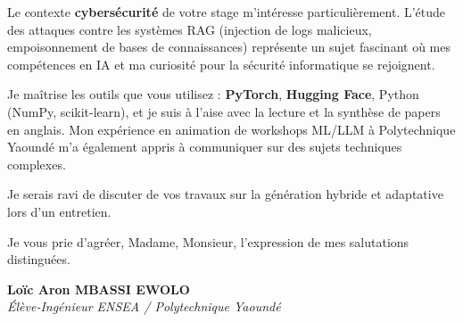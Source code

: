 \documentclass[a4paper,11pt]{article}
\begin{document}
Le contexte \textbf{cybersécurité} de votre stage m'intéresse particulièrement. L'étude des attaques contre les systèmes RAG (injection de logs malicieux, empoisonnement de bases de connaissances) représente un sujet fascinant où mes compétences en IA et ma curiosité pour la sécurité informatique se rejoignent.

Je maîtrise les outils que vous utilisez : \textbf{PyTorch}, \textbf{Hugging Face}, Python (NumPy, scikit-learn), et je suis à l'aise avec la lecture et la synthèse de papers en anglais. Mon expérience en animation de workshops ML/LLM à Polytechnique Yaoundé m'a également appris à communiquer sur des sujets techniques complexes.

Je serais ravi de discuter de vos travaux sur la génération hybride et adaptative lors d'un entretien.

Je vous prie d'agréer, Madame, Monsieur, l'expression de mes salutations distinguées.

\vspace{0.8cm}

\textbf{Loïc Aron MBASSI EWOLO}\\
\textit{Élève-Ingénieur ENSEA / Polytechnique Yaoundé}
\end{document}
